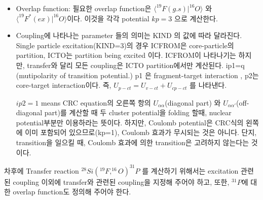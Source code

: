 \documentclass[11pt]{book}
\def\la{\langle}
\def\ra{\rangle}
\begin{document}
\begin{itemize}
\item Overlap function: 필요한 overlap function은 $\la^{19}F(g.s)|^{16}O\ra$
      와 $\la^{19}F^*(ex)|^{16}O\ra$이다. 이것을 각각 potential $kp=3$ 으로 계산한다. 
     
\item Coupling에 나타나는 parameter 들의 의미는 KIND 의 값에 따라 달라진다. 
      Single particle excitation(KIND=3)의 경우 ICFROM은 core-particle의 partition,
      ICTO는 partition being excited 이다. ICFROM이 나타나기는 하지만,
      transfer와 달리 모든 coupling은 ICTO partition에서만 계산된다. 
      ip1=q (mutipolarity of transition potential.)
      p1 은 fragment-target interaction , p2는 core-target interaction이다. 
      즉,  $U_{p-ct}=U_{v-ct}+U_{cp-ct}$ 를 나타낸다. 

      $ip2=1$ means
        CRC equation의 오른쪽 항의 $U_{\alpha\alpha}$(diagonal part)
        와 $U_{\alpha\alpha'}$(off-diagonal part)를 계산할 때 두 cluster 
        potential을 folding 할때, nuclear potential부분만 이용하라는 뜻이다. 
        하지만, Coulomb potential은 CRC식의 왼쪽에 이미 포함되어 있으므로(kp=1), 
        Coulomb 효과가 무시되는 것은 아니다. 단지, transition을 일으킬 때,
        Coulomb 효과에 의한 transition은 고려하지 않는다는 것이다.  

\end{itemize} 
차후에 Transfer reaction $^{28}Si(^{19}F,^{16}O)^{31}P$   를 계산하기 위해서는 
excitation 관련된 coupling 이외에 transfer와 관련된 coupling을 지정해 주어야 하고,
또한, $^{31}P$에 대한 overlap function도 정의해 주어야 한다. 
\end{document}
